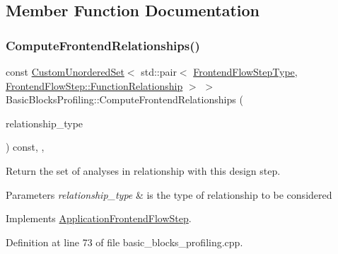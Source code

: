 \subsection{Member Function Documentation}
\mbox{\label{classBasicBlocksProfiling_a8d93b5e29d4c675309f15bfcfdbb3ce4}} 
\subsubsection{\texorpdfstring{Compute\+Frontend\+Relationships()}{ComputeFrontendRelationships()}}
{\footnotesize\ttfamily const \hyperlink{classCustomUnorderedSet}{Custom\+Unordered\+Set}$<$ std\+::pair$<$ \hyperlink{frontend__flow__step_8hpp_afeb3716c693d2b2e4ed3e6d04c3b63bb}{Frontend\+Flow\+Step\+Type}, \hyperlink{classFrontendFlowStep_af7cf30f2023e5b99e637dc2058289ab0}{Frontend\+Flow\+Step\+::\+Function\+Relationship} $>$ $>$ Basic\+Blocks\+Profiling\+::\+Compute\+Frontend\+Relationships (\begin{DoxyParamCaption}\item[{const \hyperlink{classDesignFlowStep_a723a3baf19ff2ceb77bc13e099d0b1b7}{Design\+Flow\+Step\+::\+Relationship\+Type}}]{relationship\+\_\+type }\end{DoxyParamCaption}) const\hspace{0.3cm}{\ttfamily [override]}, {\ttfamily [protected]}, {\ttfamily [virtual]}}



Return the set of analyses in relationship with this design step. 


\begin{DoxyParams}{Parameters}
{\em relationship\+\_\+type} & is the type of relationship to be considered \\
\hline
\end{DoxyParams}


Implements \hyperlink{classApplicationFrontendFlowStep_ab308200c0096ccff3a1ff50e864ed61f}{Application\+Frontend\+Flow\+Step}.



Definition at line 73 of file basic\+\_\+blocks\+\_\+profiling.\+cpp.

\mbox{\label{classBasicBlocksProfiling_a7fe35844cefbb68704d111f34b356df0}} 
